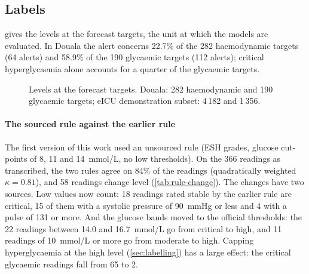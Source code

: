 \subsection{Labels}

 gives the levels at the forecast targets, the unit at which the models are evaluated. In Douala the alert concerns 22.7\% of the 282 haemodynamic targets (64 alerts) and 58.9\% of the 190 glycaemic targets (112 alerts); critical hyperglycaemia alone accounts for a quarter of the glycaemic targets.

\begin{figure}[htbp]
\centering
{}
\caption{Levels at the forecast targets. Douala: 282 haemodynamic and 190 glycaemic targets; eICU demonstration subset: 4\,182 and 1\,356.}\label{fig:level-distribution}
\end{figure}

\paragraph{The sourced rule against the earlier rule} The first version of this work used an unsourced rule (ESH grades, glucose cut-points of 8, 11 and 14~mmol/L, no low thresholds). On the 366 readings as transcribed, the two rules agree on 84\% of the readings (quadratically weighted $\kappa = 0.81$), and 58 readings change level (\cref{tab:rule-change}). The changes have two sources. Low values now count: 18 readings rated stable by the earlier rule are critical, 15 of them with a systolic pressure of 90~mmHg or less and 4 with a pulse of 131 or more. And the glucose bands moved to the official thresholds: the 22 readings between 14.0 and 16.7~mmol/L go from critical to high, and 11 readings of 10~mmol/L or more go from moderate to high. Capping hyperglycaemia at the high level (\cref{sec:labelling}) has a large effect: the critical glycaemic readings fall from 65 to 2.

